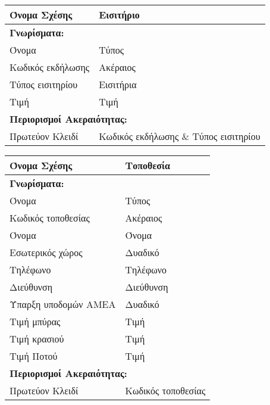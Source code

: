 \begin{tabular}{|p{6cm}|p{8cm}|}
  \hline
  Όνομα Σχέσης      & Εισιτήριο                             \\ \hline
  \multicolumn{2}{|l|}{\textbf{Γνωρίσματα:}}                \\ \hline
  Όνομα             & Τύπος                                 \\ \hline
  Κωδικός εκδήλωσης & Ακέραιος                              \\ \hline
  Τύπος εισιτηρίου  & Εισιτήρια                             \\ \hline
  Τιμή              & Τιμή                                  \\ \hline
  \multicolumn{2}{|l|}{\textbf{Περιορισμοί Ακεραιότητας:}}  \\ \hline
  Πρωτεύον Κλειδί   & Κωδικός εκδήλωσης \& Τύπος εισιτηρίου \\ \hline
\end{tabular}


\begin{tabular}{|p{6cm}|p{8cm}|}
  \hline
  Όνομα Σχέσης         & Τοποθεσία                         \\ \hline
  \multicolumn{2}{|l|}{\textbf{Γνωρίσματα:}}               \\ \hline
  Όνομα                & Τύπος                             \\ \hline
  Κωδικός τοποθεσίας   & Ακέραιος                          \\ \hline
  Όνομα                & Όνομα                             \\ \hline
  Εσωτερικός χώρος     & Δυαδικό                           \\ \hline
  Τηλέφωνο             & Τηλέφωνο                          \\ \hline
  Διεύθυνση            & Διεύθυνση                         \\ \hline
  Ύπαρξη υποδομών ΑΜΕΑ & Δυαδικό                           \\ \hline
  Τιμή μπύρας          & Τιμή                              \\ \hline
  Τιμή κρασιού         & Τιμή                              \\ \hline
  Τιμή Ποτού           & Τιμή                              \\ \hline
  \multicolumn{2}{|l|}{\textbf{Περιορισμοί Ακεραιότητας:}} \\ \hline
  Πρωτεύον Κλειδί      & Κωδικός τοποθεσίας                \\ \hline
\end{tabular}


